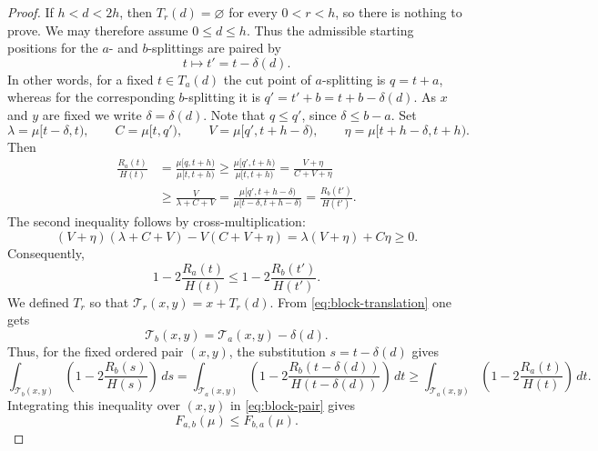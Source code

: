 \documentclass[final,12pt]{elsarticle}
\numberwithin{equation}{section}
\theoremstyle{remark}
\theoremstyle{definition}
\begin{document}
\begin{proof}
If $h<d<2h$, then $T_r(d)=\varnothing$ for every $0<r<h$,
so there is nothing to prove. We may therefore assume $0\le d\le h$. Thus the admissible starting positions for the \(a\)- and \(b\)-splittings are paired by
\[
    t\longmapsto t'=t-\delta(d).
\]
In other words, for a fixed $t\in T_a(d)$ the cut point of $a$-splitting is $q=t+a$, whereas for the corresponding $b$-splitting it is $q' = t'+b = t+b-\delta(d)$. As $x$ and $y$ are fixed we write $\delta = \delta(d)$.
Note that $q\le q'$, since $\delta\le b-a$. Set
\[
    \lambda=\mu[t-\delta,t),\qquad
    C=\mu[t,q'),\qquad
    V=\mu[q',t+h-\delta),\qquad
    \eta=\mu[t+h-\delta,t+h).
\]
Then
\[
\begin{aligned}
    \frac{R_a(t)}{H(t)}
    &=
    \frac{\mu[q,t+h)}{\mu[t,t+h)}\ge
    \frac{\mu[q',t+h)}{\mu[t,t+h)}
    =
    \frac{V+\eta}{C+V+\eta}
\\
    &\ge
    \frac{V}{\lambda+C+V}
    =
    \frac{\mu[q',t+h-\delta)}
         {\mu[t-\delta,t+h-\delta)}=\frac{R_b(t')}{H(t')}.
\end{aligned}
\]
The second inequality follows by cross-multiplication:
\[
    (V+\eta)(\lambda+C+V)
    -
    V(C+V+\eta)
    =
    \lambda(V+\eta)+C\eta
    \ge0.
\]
Consequently,
\[
    1-2\frac{R_a(t)}{H(t)}
    \le
    1-2\frac{R_b(t')}{H(t')}.
\]
We defined $T_r$ so that $\mathcal T_r(x,y) = x+T_r(d)$. From \eqref{eq:block-translation} one gets \[
    \mathcal T_b(x,y)=\mathcal T_a(x,y)-\delta(d).
\]
Thus, for the fixed ordered pair $(x,y)$, the substitution $s=t-\delta(d)$ gives
\[
\int_{\mathcal T_b(x,y)}
\left(
    1-2\frac{R_b(s)}{H(s)}
\right)\,ds
=
\int_{\mathcal T_a(x,y)}
\left(
    1-2\frac{R_b(t-\delta(d))}
             {H(t-\delta(d))}
\right)\,dt
\ge
\int_{\mathcal T_a(x,y)}
\left(
    1-2\frac{R_a(t)}{H(t)}
\right)\,dt.
\]
Integrating this inequality over $(x,y)$ in
\eqref{eq:block-pair} gives
\[
    F_{a,b}(\mu)\le F_{b,a}(\mu).
\]
\end{proof}
\end{document}

